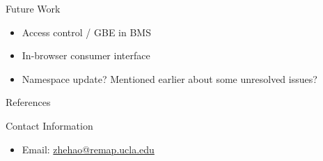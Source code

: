 \documentclass[final,hyperref={pdfpagelabels=false},20pt]{beamer}
\begin{document}
\begin{frame}[t]
\begin{columns}[t]
\begin{column}{.465\textwidth}
\begin{block}{Future Work}
\begin{itemize}
\item Access control / GBE in BMS
\item In-browser consumer interface
\item Namespace update? Mentioned earlier about some unresolved issues?
\end{itemize}
\end{block}


\begin{block}{References}
        
\nocite{*}
\small{
}

\end{block}



\begin{block}{Contact Information}

\begin{itemize}
\item Email: \href{mailto:zhehao@remap.ucla.edu}{zhehao@remap.ucla.edu}
\end{itemize}

\end{block}


\end{column} %

\begin{column}{.015\textwidth}\end{column} %

\end{columns} %

\end{frame} %
\end{document}
